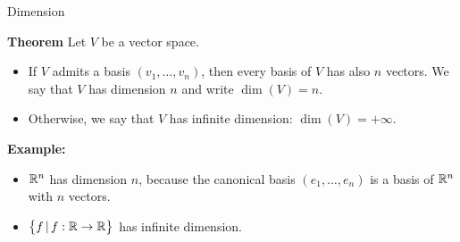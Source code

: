 \documentclass{beamer}
\begin{document}
\begin{frame}[t]{Dimension}
	\begin{block}{\bf Theorem}
	Let $V$ be a vector space.
	\begin{itemize}
		\item If $V$ admits a basis $(v_1, \dots, v_n)$, then every basis of $V$ has also $n$ vectors. We say that $V$ has dimension $n$ and write $\dim(V) = n$.
		\item Otherwise, we say that $V$ has infinite dimension: $\dim(V) = +\infty$.
	\end{itemize}
	\end{block}
	\textbf{Example:} 
	\begin{itemize}
		\item $\mathbb{R}^n$ has dimension $n$, because the canonical basis $(e_1,\dots, e_n)$ is a basis of $\mathbb{R}^n$ with $n$ vectors.
		\item $\big\{ f \, | \, f: \mathbb{R} \to \mathbb{R} \big\}$ has infinite dimension.
	\end{itemize}
\end{frame}


\end{document}
